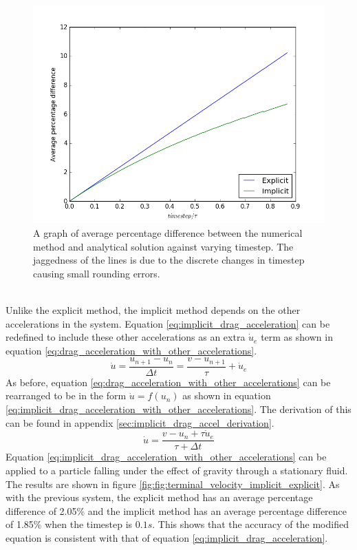 \documentclass[10pt,a4paper,titlepage]{report}
\begin{document}
\begin{figure}[!htb]
\centering
\includegraphics[scale=0.75]{figures/AveragePercentageDifferenceAgainstTimestep.png}
\caption{A graph of average percentage difference between the numerical method and analytical solution against varying timestep. The jaggedness of the lines is due to the discrete changes in timestep causing small rounding errors.}
\label{fig:avg_percent_diff_against_timestep}
\end{figure}
\\Unlike the explicit method, the implicit method depends on the other accelerations in the system. Equation \ref{eq:implicit_drag_acceleration} can be redefined to include these other accelerations as an extra $\dot{u}_{e}$ term as shown in equation \ref{eq:drag_acceleration_with_other_accelerations}.
\begin{equation}
\dot{u} = \dfrac{u_{n+1} - u_{n}}{\Delta t} = \dfrac{v - u_{n+1}}{\tau} + \dot{u}_{e}
\label{eq:drag_acceleration_with_other_accelerations}
\end{equation}
As before, equation \ref{eq:drag_acceleration_with_other_accelerations} can be rearranged to be in the form $\dot{u} = f(u_{n})$ as shown in equation \ref{eq:implicit_drag_acceleration_with_other_accelerations}. The derivation of this can be found in appendix \ref{sec:implicit_drag_accel_derivation}.
\begin{equation}
\dot{u} = \dfrac{v - u_{n} + \tau \dot{u}_{e}}{\tau + \Delta t}
\label{eq:implicit_drag_acceleration_with_other_accelerations}
\end{equation}
Equation \ref{eq:implicit_drag_acceleration_with_other_accelerations} can be applied to a particle falling under the effect of gravity through a stationary fluid. The results are shown in figure \ref{fig:fig:terminal_velocity_implicit_explicit}. As with the previous system, the explicit method has an average percentage difference of 2.05\% and the implicit method has an average percentage difference of 1.85\% when the timestep is $0.1 s$. This shows that the accuracy of the modified equation is consistent with that of equation \ref{eq:implicit_drag_acceleration}.
\end{document}
